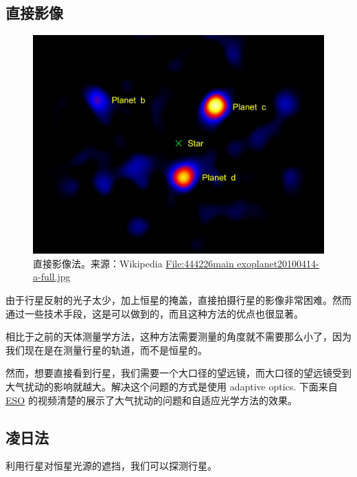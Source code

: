 \documentclass[letterpaper,10pt,english]{sphinxmanual}
\begin{document}

\subsection{直接影像}
\label{detection:id6}\label{detection:index-5}\begin{figure}[htbp]
\centering
\capstart

\includegraphics{directImaging.jpg}
\caption{直接影像法。来源：Wikipedia \href{https://zh.wikipedia.org/wiki/File:444226main\_exoplanet20100414-a-full.jpg}{File:444226main exoplanet20100414-a-full.jpg}}\end{figure}

由于行星反射的光子太少，加上恒星的掩盖，直接拍摄行星的影像非常困难。然而通过一些技术手段，这是可以做到的，而且这种方法的优点也很显著。

相比于之前的天体测量学方法，这种方法需要测量的角度就不需要那么小了，因为我们现在是在测量行星的轨道，而不是恒星的。

然而，想要直接看到行星，我们需要一个大口径的望远镜，而大口径的望远镜受到大气扰动的影响就越大。解决这个问题的方式是使用 adaptive optics. 下面来自 \href{http://www.eso.org/public/videos/adaptiveopticsandmask/}{ESO} 的视频清楚的展示了大气扰动的问题和自适应光学方法的效果。


\subsection{凌日法}
\label{detection:id7}\label{detection:index-7}
利用行星对恒星光源的遮挡，我们可以探测行星。
\end{document}

